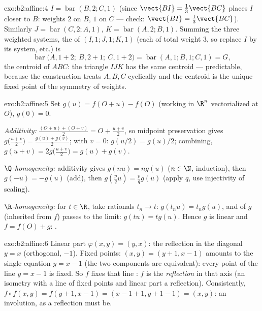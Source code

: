 \begin{solution}{exo:b2:affine:4}
$I = \operatorname{bar}(B, 2; C, 1)$ (since $\vect{BI} =
\frac13\vect{BC}$ places $I$ closer to $B$: weights $2$ on $B$,
$1$ on $C$ --- check: $\vect{BI} = \frac{1}{3}\vect{BC}$).
Similarly $J = \operatorname{bar}(C, 2; A, 1)$, $K =
\operatorname{bar}(A, 2; B, 1)$. Summing the three weighted
systems, the  of $(I, 1; J, 1; K, 1)$ (each of total
weight $3$, so replace $I$ by its system, etc.) is
\[
\operatorname{bar}\bigl(A, 1 + 2;\ B, 2 + 1;\ C, 1 + 2\bigr)
= \operatorname{bar}(A, 1; B, 1; C, 1) = G ,
\]
the centroid of $ABC$: the triangle $IJK$ has the same centroid ---
predictable, because the construction treats $A, B, C$ cyclically
and the centroid is the unique fixed point of the  symmetry
of weights.
\end{solution}

\begin{solution}{exo:b2:affine:5}
Set $g(u) = f(O + u) - f(O)$ (working in $\R^n$ vectorialized at
$O$), $g(0) = 0$.

\emph{Additivity:} $\frac{(O + u) + (O + v)}{2} = O + \frac{u +
v}{2}$, so midpoint preservation gives $g\bigl(\frac{u+v}{2}\bigr)
= \frac{g(u) + g(v)}{2}$; with $v = 0$: $g(u/2) = g(u)/2$;
combining, $g(u + v) = 2g\bigl(\frac{u+v}{2}\bigr) = g(u) + g(v)$.

\emph{$\Q$-homogeneity:} additivity gives $g(nu) = ng(u)$ ($n \in
\N$, induction), then $g(-u) = -g(u)$ (add), then $g(\frac pq u) =
\frac pq g(u)$ (apply $q$, use injectivity of scaling).

\emph{$\R$-homogeneity:} for $t \in \R$, take rationals $t_n \to
t$: $g(t_nu) = t_ng(u)$, and  of $g$ (inherited from $f$)
passes to the limit: $g(tu) = tg(u)$. Hence $g$ is linear and $f =
f(O) + g$: .
\end{solution}

\begin{solution}{exo:b2:affine:6}
Linear part $\varphi(x,y) = (y, x)$: the reflection in the diagonal
$y = x$ (orthogonal,  $-1$). Fixed points: $(x, y) = (y
+ 1, x - 1)$ amounts to the single equation $y = x - 1$ (the two
components are equivalent): every point of the line $y = x - 1$ is
fixed. So $f$ fixes that line : $f$
is the \emph{reflection} in that axis (an isometry with a line of
fixed points and linear part a reflection). Consistently, $f \circ
f(x,y) = f(y+1, x-1) = (x - 1 + 1, y + 1 - 1) = (x, y)$: an
involution, as a reflection must be.
\end{solution}


